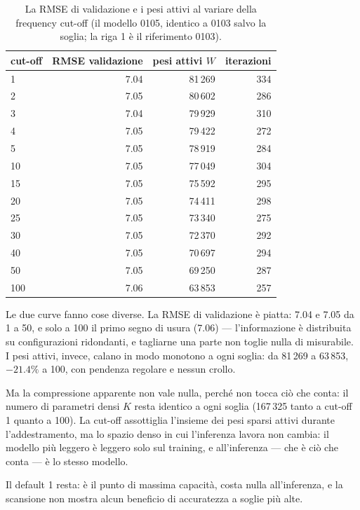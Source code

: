 \begin{table}[ht]
\centering
\begin{tabular}{lrrr}
\toprule
cut-off & RMSE validazione & pesi attivi $W$ & iterazioni \\
\midrule
1  & 7.04 & 81\,269 & 334 \\
2  & 7.05 & 80\,602 & 286 \\
3  & 7.04 & 79\,929 & 310 \\
4  & 7.05 & 79\,422 & 272 \\
5  & 7.05 & 78\,919 & 284 \\
10 & 7.05 & 77\,049 & 304 \\
15 & 7.05 & 75\,592 & 295 \\
20 & 7.05 & 74\,411 & 298 \\
25 & 7.05 & 73\,340 & 275 \\
30 & 7.05 & 72\,370 & 292 \\
40 & 7.05 & 70\,697 & 294 \\
50 & 7.05 & 69\,250 & 287 \\
100 & 7.06 & 63\,853 & 257 \\
\bottomrule
\end{tabular}
\caption{La RMSE di validazione e i pesi attivi al variare della
frequency cut-off (il modello 0105, identico a 0103 salvo la soglia;
la riga 1 è il riferimento 0103).}
\label{tab:frequency-curva}
\end{table}

Le due curve fanno cose diverse. La RMSE di validazione è piatta: 7.04
e 7.05 da 1 a 50, e solo a 100 il primo segno di usura (7.06) —
l'informazione è distribuita su configurazioni ridondanti, e tagliarne
una parte non toglie nulla di misurabile. I pesi attivi, invece,
calano in modo monotono a ogni soglia: da 81\,269 a 63\,853,
$-21.4\%$ a 100, con pendenza regolare e nessun crollo.

Ma la compressione apparente non vale nulla, perché non tocca ciò che
conta: il numero di parametri densi $K$ resta identico a ogni soglia
(167\,325 tanto a cut-off 1 quanto a 100). La cut-off assottiglia
l'insieme dei pesi sparsi attivi durante l'addestramento, ma lo
spazio denso in cui l'inferenza lavora non cambia: il modello più
leggero è leggero solo sul training, e all'inferenza — che è ciò che
conta — è lo stesso modello.

Il default 1 resta: è il punto di massima capacità, costa nulla
all'inferenza, e la scansione non mostra alcun beneficio di
accuratezza a soglie più alte.

